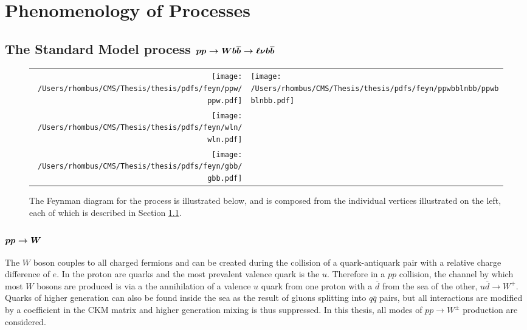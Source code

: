 

\chapter{Phenomenology of Processes}

\section[The Standard Model process \ppwbblnbb]
{The Standard Model process $\boldsymbol{pp\rightarrow Wb\overline{b}\rightarrow\ell\nu b\overline{b}}$} \label{sec:wbbproduction}

\begin{figure}[!h]
 \center
 \caption[Feynman diagrams for \ppwbblnbb]{
  The Feynman diagram for the process
   \ppwbblnbb is illustrated below,
   and is composed from the individual vertices 
   illustrated on the left, each of which is
   described in Section \ref{sec:wbbproduction}.
 } 
\begin{tabular}{rl}
 \texttt{[image: /Users/rhombus/CMS/Thesis/thesis/pdfs/feyn/ppw/ppw.pdf]} & 
 \multirow{3}{*}{\texttt{[image: /Users/rhombus/CMS/Thesis/thesis/pdfs/feyn/ppwbblnbb/ppwbblnbb.pdf]}} \\
 \texttt{[image: /Users/rhombus/CMS/Thesis/thesis/pdfs/feyn/wln/wln.pdf]} & {} \\
 \texttt{[image: /Users/rhombus/CMS/Thesis/thesis/pdfs/feyn/gbb/gbb.pdf]} & {}
\end{tabular} 
    \label{fig:ppwbblnbbfeyn}
\end{figure}

 \subsection[\ppw]
 {$\boldsymbol{pp\rightarrow W}$}

  The $W$ boson couples to all charged fermions
   and can be
   created during the collision of a quark-antiquark
   pair with a relative charge difference of $e$.
  In the proton are quarks and the most prevalent valence
   quark is the $u$.
  Therefore in a $pp$ collision,
   the channel by which most
   $W$ bosons are produced is
   via a the annihilation of a valence $u$ quark
   from one proton with 
   a $\overline{d}$ from the sea of the other,
   $u\overline{d}\rightarrow W^+$.
  Quarks of higher generation can also be found
   inside the sea as the result of gluons splitting into
   $q\overline{q}$ pairs, but all interactions
   are modified by a coefficient in the CKM matrix
   and higher generation mixing is thus suppressed.
  In this thesis, all modes of $pp\rightarrow W^\pm$ production are
   considered.

